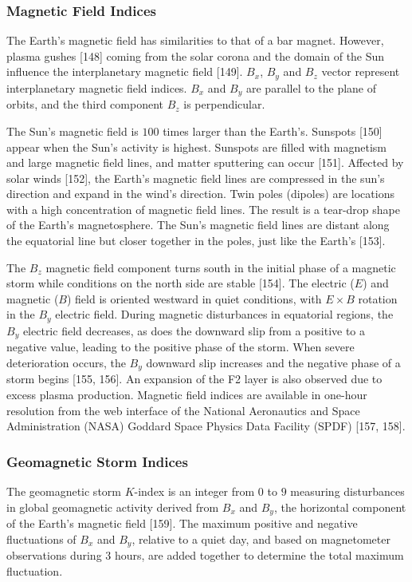 \documentclass[sn-mathphys-num]{sn-jnl}%
\begin{document}
\subsubsection{Magnetic Field Indices}

The Earth's magnetic field has similarities to that of a bar magnet. However, plasma gushes [148] coming from the solar corona and the domain of the Sun influence the interplanetary magnetic field [149]. $B_{x}$, $B_{y}$ and $B_{z}$ vector represent interplanetary magnetic field indices. $B_{x}$ and $B_{y}$ are parallel to the plane of orbits, and the third component $B_{z}$ is perpendicular. 

The Sun's magnetic field is $100$ times larger than the Earth's. Sunspots [150] appear when the Sun's activity is highest. Sunspots are filled with magnetism and large magnetic field lines, and matter sputtering can occur [151]. Affected by solar winds [152], the Earth's magnetic field lines are compressed in the sun's direction and expand in the wind's direction. Twin poles (dipoles) are locations with a high concentration of magnetic field lines. The result is a tear-drop shape of the Earth's magnetosphere. The Sun's magnetic field lines are distant along the equatorial line but closer together in the poles, just like the Earth's [153].

The $B_{z}$ magnetic field component turns south in the initial phase of a magnetic storm while conditions on the north side are stable [154]. The electric ($E$) and magnetic ($B$) field is oriented westward in quiet conditions, with $E \times B$ rotation in the $B_{y}$ electric field. During magnetic disturbances in equatorial regions, the $B_{y}$ electric field decreases, as does the downward slip from a positive to a negative value, leading to the positive phase of the storm. When severe deterioration occurs, the $B_{y}$ downward slip increases and the negative phase of a storm begins [155, 156]. An expansion of the F2 layer is also observed due to excess plasma production. Magnetic field indices are available in one-hour resolution from the web interface of the National Aeronautics and Space Administration (NASA) Goddard Space Physics Data Facility (SPDF) [157, 158].
 
\subsubsection{Geomagnetic Storm Indices}

The geomagnetic storm $K$-index is an integer from $0$ to $9$ measuring disturbances in global geomagnetic activity derived from $B_{x}$ and $B_{y}$, the horizontal component of the Earth's magnetic field [159]. The maximum positive and negative fluctuations of $B_{x}$ and $B_{y}$, relative to a quiet day, and based on magnetometer observations during $3$ hours, are added together to determine the total maximum fluctuation.
\end{document}
